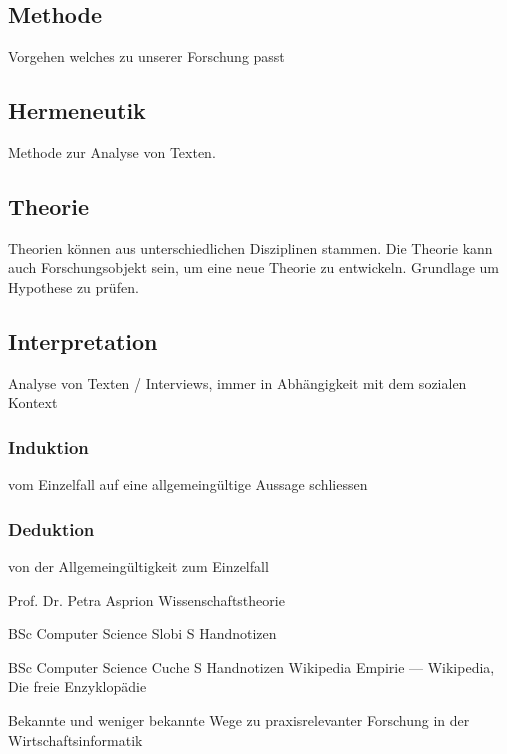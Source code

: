 \documentclass[DIV=calc, paper=a4, fontsize=11pt, twocolumn]{scrartcl}	 %
\begin{document}
\subsection*{Methode}
Vorgehen welches zu unserer Forschung passt

\subsection*{Hermeneutik}
Methode zur Analyse von Texten.

\subsection*{Theorie}
Theorien können aus unterschiedlichen Disziplinen stammen. Die Theorie kann auch Forschungsobjekt sein, um eine neue Theorie zu entwickeln.
Grundlage um Hypothese zu pr\"ufen.

\subsection*{Interpretation}
Analyse von Texten / Interviews, immer in Abh\"angigkeit mit dem sozialen Kontext

\subsubsection*{Induktion}
vom Einzelfall auf eine allgemeing\"ultige Aussage schliessen

\subsubsection*{Deduktion}
von der Allgemeing\"ultigkeit zum Einzelfall

\begin{thebibliography}{99} %

Prof. Dr. Petra Asprion
\newblock Wissenschaftstheorie
 
BSc Computer Science Slobi S
\newblock Handnotizen

BSc Computer Science Cuche S
\newblock Handnotizen
 Wikipedia
 \newblock Empirie --- Wikipedia{,} Die freie Enzyklopädie

 
 \newblock Bekannte und weniger bekannte Wege zu praxisrelevanter Forschung in der Wirtschaftsinformatik
\end{thebibliography}

\end{document}
